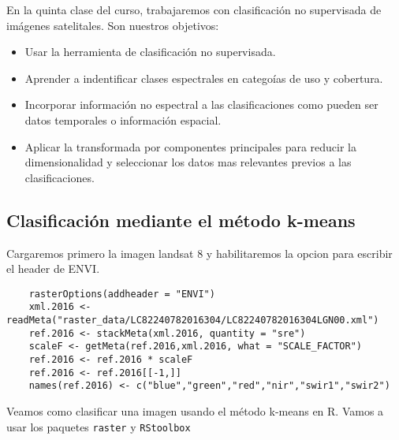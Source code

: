 En la quinta clase del curso, trabajaremos con clasificaci\'on no supervisada
de im\'agenes satelitales. Son nuestros objetivos:

\begin{itemize}
  \item Usar la herramienta de clasificaci\'on no supervisada.
  \item Aprender a indentificar clases espectrales en catego\'ias de uso y cobertura.
  \item Incorporar informaci\'on no espectral a las clasificaciones como
  pueden ser datos temporales o informaci\'on espacial.
  \item Aplicar la transformada por componentes principales para reducir la dimensionalidad
  y seleccionar los datos mas relevantes previos a las clasificaciones.
\end{itemize}

\subsection{Clasificaci\'on mediante el m\'etodo k-means}

Cargaremos primero la imagen landsat 8 y habilitaremos la opcion para escribir
el header de ENVI\@.

\begin{lstlisting}
    rasterOptions(addheader = "ENVI")
    xml.2016 <- readMeta("raster_data/LC82240782016304/LC82240782016304LGN00.xml")
    ref.2016 <- stackMeta(xml.2016, quantity = "sre")
    scaleF <- getMeta(ref.2016,xml.2016, what = "SCALE_FACTOR")
    ref.2016 <- ref.2016 * scaleF
    ref.2016 <- ref.2016[[-1,]]
    names(ref.2016) <- c("blue","green","red","nir","swir1","swir2")
\end{lstlisting}

Veamos como clasificar una imagen usando el m\'etodo k-means en R. Vamos a usar
los paquetes \texttt{raster} y \texttt{RStoolbox}

